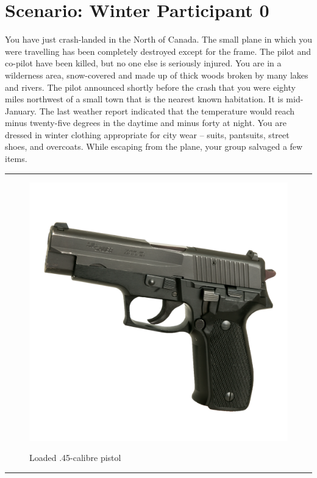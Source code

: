 \documentclass{article}
\begin{document}
    \section*{Scenario: \textmd{Winter} \hfill Participant \textmd{0}}
    \Large You have just crash-landed in the North of Canada. The small plane in which you were travelling has been completely destroyed except for the frame. The pilot and co-pilot have been killed, but no one else is seriously injured.
You are in a wilderness area, snow-covered and made up of thick woods broken by many lakes and rivers. The pilot announced shortly before the crash that you were eighty miles northwest of a small town that is the nearest known habitation. It is mid-January. The last weather report indicated that the temperature would reach minus twenty-five degrees in the daytime and minus forty at night. You are dressed in winter clothing appropriate for city wear – suits, pantsuits, street shoes, and overcoats. While escaping from the plane, your group salvaged a few items.
\clearpage
        \par\noindent\rule{\textwidth}{0.4pt}
    \begin{figure}[H]
        \centering
        \begin{minipage}{0.25\textwidth}
            \centering
            \includegraphics[width=\textwidth]{../SurvivalItemImages/pistol}
        \end{minipage}\hfill
        \begin{minipage}{0.7\textwidth}
            \centering
            \Large Loaded .45-calibre pistol
        \end{minipage}
    \end{figure}
    \vspace{-0.8em}
    \noindent\rule{\textwidth}{0.4pt}
            
\end{document}
